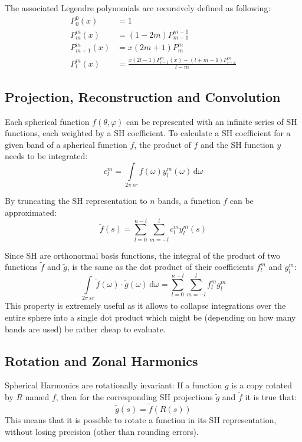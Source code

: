 \documentclass[thesis.tex]{subfiles}
\begin{document}
The associated Legendre polynomials are recursively defined as following:
\begin{equation}
	\begin{alignedat}{2}
		P^0_0(x) &= 1\\
		P^m_m(x) &= (1-2m)P^{m-1}_{m-1}\\
		P^m_{m+1}(x) &= x(2m+1)P^m_m\\	
		P^m_l(x) &= \frac{x(2l-1)P^m_{l-1}(x)-(l+m-1)P^m_{l-2}}{l-m}
	\end{alignedat}
\end{equation}


\subsection{Projection, Reconstruction and Convolution} \label{sec:preq:shprojectrecon}
Each spherical function $f(\theta, \varphi)$ can be represented with an infinite series of SH functions, each weighted by a SH coefficient.
To calculate a SH coefficient for a given band of a spherical function $f$, the product of $f$ and the SH function $y$ needs to be integrated:
\begin{equation} \label{eq:shprojection}
	c^m_l=\int\limits_{2\pi\,sr} f(\omega)y^m_l(\omega)\, \mathrm{d}\omega
\end{equation}

By truncating the SH representation to $n$ bands, a function $f$ can be approximated:
\begin{equation}
	\widetilde{f}(s) = \sum_{l=0}^{n-l}\sum_{m=-l}^l c_l^m y_l^m(s)
\end{equation}

Since SH are orthonormal basis functions, the integral of the product of two functions $\widetilde{f}$ and $\widetilde{g}$, is the same as the dot product of their coefficients $f_l^m$ and $g_l^m$:
\begin{equation}
	\int\limits_{2\pi\,sr} \widetilde{f}(\omega) \cdot \widetilde{g}(\omega) \, \mathrm{d}\omega =
	\sum_{l=0}^{n-l}\sum_{m=-l}^l f_l^m g_l^m
\end{equation}
This property is extremely useful as it allows to collapse integrations over the entire sphere into a single dot product which might be (depending on how many bands are used) be rather cheap to evaluate.

\subsection{Rotation and Zonal Harmonics} \label{sec:preq:zonalharmonics}
Spherical Harmonics are rotationally invariant:
If a function $g$ is a copy rotated by $R$ named $f$, then for the corresponding SH projections $\widetilde{g}$ and $\widetilde{f}$ it is true that:
\begin{equation}
	\widetilde{g}(s) = \widetilde{f}(R(s))
\end{equation}
This means that it is possible to rotate a function in its SH representation, without losing precision (other than rounding errors).
\end{document}
